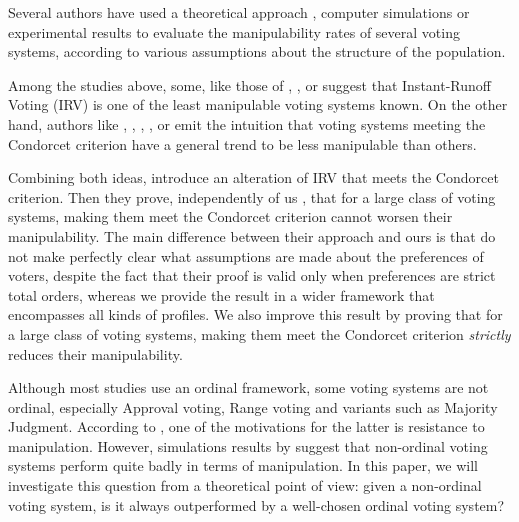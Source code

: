 Several authors have used a theoretical approach \citep{lepelley1987proportion,lepelley1994vulnerability,kim1996manipulability,lepelley1999kimroush, huang2000analytical,favardin2002bordacopeland,lepelley2003homogeneity,favardin2006further,pritchard2007exact,lepelley2008ehrhart}, computer simulations \citep{lepelley1987proportion,pritchard2007exact,reyhani2009anewmeasure,green2011four,green2014strategic,green2014statistical} or experimental results \citep{chamberlin1984observed,tideman2006collective,green2014strategic,green2014statistical} to evaluate the manipulability rates of several voting systems, according to various assumptions about the structure of the population. 

Among the studies above, some, like those of \cite{chamberlin1984observed}, \cite{lepelley1994vulnerability}, \cite{lepelley2003homogeneity} or \cite{green2011four,green2014strategic} suggest that Instant-Runoff Voting (IRV) is one of the least manipulable voting systems known. On the other hand, authors like \cite{chamberlin1984observed}, \cite{smith1999measures}, \cite{favardin2002bordacopeland}, \cite{lepelley2003homogeneity}, \cite{favardin2006further} or \cite{tideman2006collective} emit the intuition that voting systems meeting the Condorcet criterion have a general trend to be less manipulable than others.

Combining both ideas, \cite{green2014statistical} introduce an alteration of IRV that meets the Condorcet criterion. Then they prove, independently of us \citep{durand2012manipulability}, that for a large class of voting systems, making them meet the Condorcet criterion cannot worsen their manipulability. The main difference between their approach and ours is that \cite{green2014statistical} do not make perfectly clear what assumptions are made about the preferences of voters, despite the fact that their proof is valid only when preferences are strict total orders, whereas we provide the result in a wider framework that encompasses all kinds of profiles. We also improve this result by proving that for a large class of voting systems, making them meet the Condorcet criterion \emph{strictly} reduces their manipulability.

Although most studies use an ordinal framework, some voting systems are not ordinal, especially Approval voting, Range voting and variants such as Majority Judgment. According to \cite{balinski2010majority}, one of the motivations for the latter is resistance to manipulation. However, simulations results by \cite{durand2014newsimulation} suggest that non-ordinal voting systems perform quite badly in terms of manipulation. In this paper, we will investigate this question from a theoretical point of view: given a non-ordinal voting system, is it always outperformed by a well-chosen ordinal voting system?

